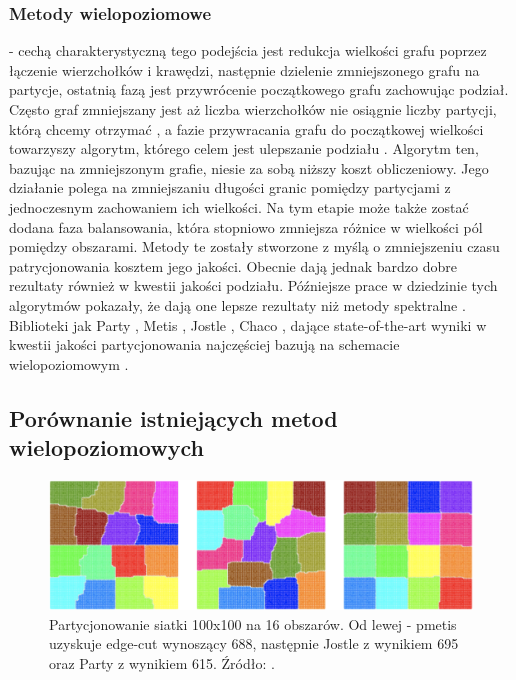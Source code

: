 \subsubsection{Metody wielopoziomowe}
\cite{metis, jostle, Bui1993AHF, 103500, 185177, 279334, inproceedings, 129970, 10.1145/165939.165942}
- cechą charakterystyczną tego podejścia jest redukcja
wielkości grafu poprzez łączenie wierzchołków i krawędzi, następnie dzielenie zmniejszonego grafu na partycje, ostatnią fazą
jest przywrócenie początkowego grafu zachowując podział. Często graf zmniejszany jest aż liczba wierzchołków nie osiągnie
liczby partycji, którą chcemy otrzymać \cite{1364754}, a fazie przywracania grafu do początkowej wielkości towarzyszy
algorytm, którego celem jest ulepszanie podziału \cite{article, 10.5555/800263.809204}. Algorytm ten, bazując na zmniejszonym
grafie, niesie za sobą niższy koszt obliczeniowy. Jego działanie polega na zmniejszaniu długości granic pomiędzy partycjami
z jednoczesnym zachowaniem ich wielkości. Na tym etapie może także zostać dodana faza balansowania, która stopniowo zmniejsza różnice
w wielkości pól pomiędzy obszarami. Metody te zostały stworzone z myślą o zmniejszeniu czasu
patrycjonowania kosztem jego jakości. Obecnie dają jednak bardzo dobre rezultaty również w kwestii jakości podziału.
Późniejsze prace w dziedzinie tych algorytmów pokazały, że dają one lepsze rezultaty niż metody spektralne \cite{metis}.
Biblioteki jak Party \cite{1364754}, Metis \cite{metis}, Jostle \cite{jostle}, Chaco \cite{inproceedings},
dające state-of-the-art wyniki w kwestii jakości partycjonowania najczęściej bazują na schemacie wielopoziomowym
\cite{inproceedings}.

\newpage

\subsection{Porównanie istniejących metod wielopoziomowych}

\begin{figure}
    \vspace{-4mm}
    \includegraphics[width=\linewidth]{images/libraries-comparision}
    \caption{Partycjonowanie siatki 100x100 na 16 obszarów. Od lewej - pmetis \cite{metis} uzyskuje edge-cut wynoszący
    688, następnie Jostle \cite{jostle} z wynikiem 695 oraz Party \cite{1364754} z wynikiem 615. Źródło: \cite{1364754}.}
    \label{im:partitioning_results}
\end{figure}

